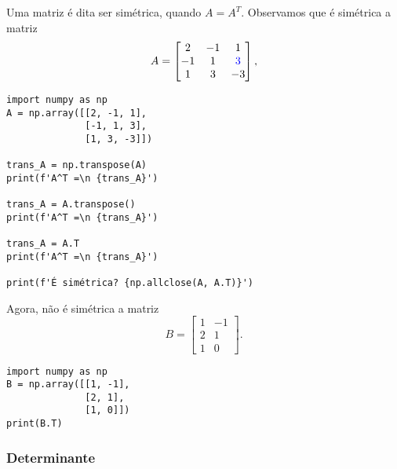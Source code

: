 \begin{ex}
  Uma matriz é dita ser simétrica, quando $A = A^T$. Observamos que é simétrica a matriz
  \begin{equation}
    A =
    \begin{bmatrix}
      2 & -1 & 1\\
      -1 & 1 & {\color{blue}3}\\
      1 & 3 & -3
    \end{bmatrix},
  \end{equation}

\begin{lstlisting}
import numpy as np
A = np.array([[2, -1, 1],
              [-1, 1, 3],
              [1, 3, -3]])

trans_A = np.transpose(A) 
print(f'A^T =\n {trans_A}')

trans_A = A.transpose() 
print(f'A^T =\n {trans_A}')

trans_A = A.T
print(f'A^T =\n {trans_A}')

print(f'É simétrica? {np.allclose(A, A.T)}')
\end{lstlisting}

Agora, não é simétrica a matriz
  \begin{equation}
    B =
    \begin{bmatrix}
      1 & -1\\
      2 & 1\\
      1 & 0
    \end{bmatrix}.
  \end{equation}

\begin{lstlisting}
import numpy as np
B = np.array([[1, -1],
              [2, 1],
              [1, 0]])
print(B.T)
\end{lstlisting}

\end{ex}

\subsubsection{Determinante}

